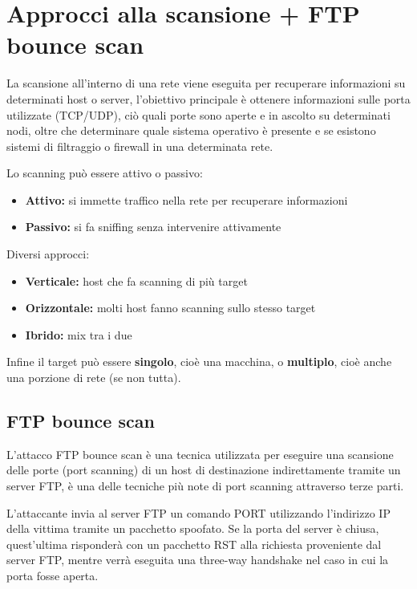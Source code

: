 \documentclass{report}
\begin{document}
\section{Approcci alla scansione + FTP bounce scan}
\noindent La scansione all'interno di una rete viene eseguita per recuperare informazioni su determinati host o server, l'obiettivo principale è ottenere informazioni
sulle porta utilizzate (TCP/UDP), ciò quali porte sono aperte e in ascolto su determinati nodi, oltre che determinare quale sistema operativo è presente e se esistono sistemi di filtraggio o 
firewall in una determinata rete.

\noindent Lo scanning può essere attivo o passivo:
\begin{itemize}
    \item \textbf{Attivo:} si immette traffico nella rete per recuperare informazioni
    \item \textbf{Passivo:} si fa sniffing senza intervenire attivamente
\end{itemize}

\noindent Diversi approcci:
\begin{itemize}
    \item \textbf{Verticale:} host che fa scanning di più target 
    \item \textbf{Orizzontale:} molti host fanno scanning sullo stesso target 
    \item \textbf{Ibrido:} mix tra i due
\end{itemize}

\noindent Infine il target può essere \textbf{singolo}, cioè una macchina, o \textbf{multiplo}, cioè anche una porzione di rete (se non tutta).

\subsection{FTP bounce scan}
L'attacco FTP bounce scan è una tecnica utilizzata per eseguire una scansione delle porte (port scanning) di un host di destinazione indirettamente tramite un server FTP, è una delle tecniche più note di port scanning attraverso terze parti.

\noindent L'attaccante invia al server FTP un comando PORT utilizzando l'indirizzo IP della vittima tramite un pacchetto spoofato.
Se la porta del server è chiusa, quest'ultima risponderà con un pacchetto RST alla richiesta proveniente dal server FTP, mentre verrà eseguita una three-way handshake nel caso in cui la porta fosse aperta.
\end{document}

